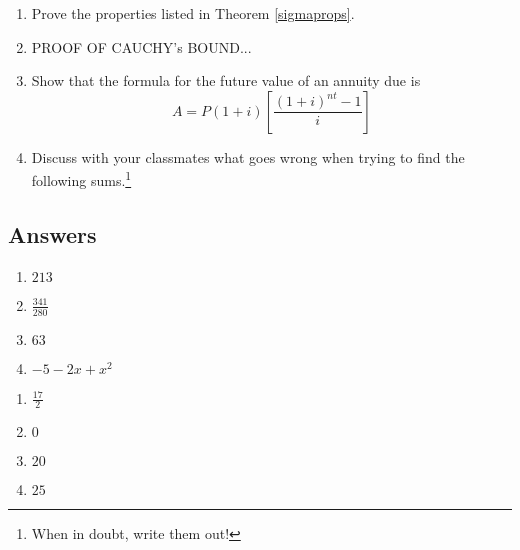 \begin{enumerate}
\setcounter{enumi}{\value{HW}}

\item Prove the properties listed in Theorem \ref{sigmaprops}.

\item  \label{CauchyBoundProofExercise}  PROOF OF CAUCHY's BOUND...

\item Show that the formula for the future value of an annuity due is \[A = P(1 + i)\left[\frac{(1 + i)^{nt} - 1}{i}\right]\]

\item  Discuss with your classmates what goes wrong when trying to find the following sums.\footnote{When in doubt, write them out!}


\begin{enumerate}


\end{enumerate}

\end{enumerate}
\newpage

\subsection{Answers}

\begin{multicols}{4} 
\begin{enumerate}

\item $213$
\item $\frac{341}{280}$
\item $63$
\item $-5 - 2x + x^{2}$

\setcounter{HW}{\value{enumi}}
\end{enumerate}
\end{multicols}

\begin{multicols}{4} 
\begin{enumerate}
\setcounter{enumi}{\value{HW}}


\item $\frac{17}{2}$
\item $0$
\item  $20$
\item  $25$

\setcounter{HW}{\value{enumi}}
\end{enumerate}
\end{multicols}


